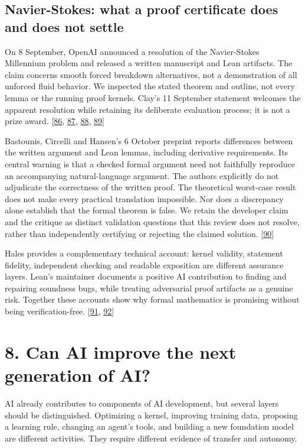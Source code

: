 \subsection*{Navier-Stokes: what a proof certificate does and does not settle}
On 8 September, OpenAI announced a resolution of the Navier-Stokes Millennium problem and released a written manuscript and Lean artifacts. The claim concerns smooth forced breakdown alternatives, not a demonstration of all unforced fluid behavior. We inspected the stated theorem and outline, not every lemma or the running proof kernels. Clay's 11 September statement welcomes the apparent resolution while retaining its deliberate evaluation process; it is not a prize award. [\hyperlink{ref-openainavier2026}{86}, \hyperlink{ref-openainavierpaper2026}{87}, \hyperlink{ref-openainaviercode2026}{88}, \hyperlink{ref-claynavier2026}{89}]


Bastounis, Circelli and Hansen's 6 October preprint reports differences between the written argument and Lean lemmas, including derivative requirements. Its central warning is that a checked formal argument need not faithfully reproduce an accompanying natural-language argument. The authors explicitly do not adjudicate the correctness of the written proof. The theoretical worst-case result does not make every practical translation impossible. Nor does a discrepancy alone establish that the formal theorem is false. We retain the developer claim and the critique as distinct validation questions that this review does not resolve, rather than independently certifying or rejecting the claimed solution. [\hyperlink{ref-naviertranslation2026}{90}]


Hales provides a complementary technical account: kernel validity, statement fidelity, independent checking and readable exposition are different assurance layers. Lean's maintainer documents a positive AI contribution to finding and repairing soundness bugs, while treating adversarial proof artifacts as a genuine risk. Together these accounts show why formal mathematics is promising without being verification-free. [\hyperlink{ref-hales2026}{91}, \hyperlink{ref-demourakernel2026}{92}]



\section*{8. Can AI improve the next generation of AI?}
AI already contributes to components of AI development, but several layers should be distinguished. Optimizing a kernel, improving training data, proposing a learning rule, changing an agent's tools, and building a new foundation model are different activities. They require different evidence of transfer and autonomy.


